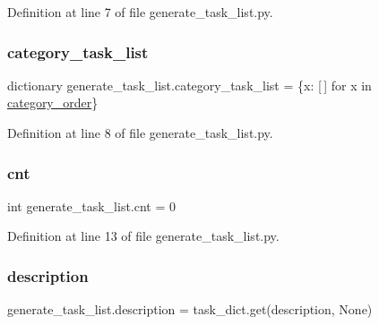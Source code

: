 Definition at line 7 of file generate\+\_\+task\+\_\+list.\+py.

\mbox{\label{namespacegenerate__task__list_a7cc034df06c75ab55d875c56f83a725b}} 
\subsubsection{\texorpdfstring{category\+\_\+task\+\_\+list}{category\_task\_list}}
{\footnotesize\ttfamily dictionary generate\+\_\+task\+\_\+list.\+category\+\_\+task\+\_\+list = \{x\+: \mbox{[}$\,$\mbox{]} for x in \hyperlink{namespacegenerate__task__list_a7697d682f472185323fda0300e278233}{category\+\_\+order}\}}



Definition at line 8 of file generate\+\_\+task\+\_\+list.\+py.

\mbox{\label{namespacegenerate__task__list_ae18a2eff051bd4be84f3f37eb80342fb}} 
\subsubsection{\texorpdfstring{cnt}{cnt}}
{\footnotesize\ttfamily int generate\+\_\+task\+\_\+list.\+cnt = 0}



Definition at line 13 of file generate\+\_\+task\+\_\+list.\+py.

\mbox{\label{namespacegenerate__task__list_af4d07327ee07ddc711991e687bfe3a0a}} 
\subsubsection{\texorpdfstring{description}{description}}
{\footnotesize\ttfamily generate\+\_\+task\+\_\+list.\+description = task\+\_\+dict.\+get(\textquotesingle{}description\textquotesingle{}, None)}



